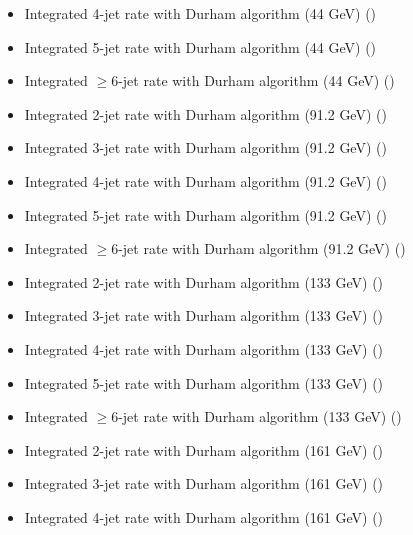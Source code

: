 \begin{itemize}
  \item Integrated 4-jet rate with Durham algorithm (44 GeV) ({\smaller {}})
  \item Integrated 5-jet rate with Durham algorithm (44 GeV) ({\smaller {}})
  \item Integrated $\geq$6-jet rate with Durham algorithm (44 GeV) ({\smaller {}})
  \item Integrated 2-jet rate with Durham algorithm (91.2 GeV) ({\smaller {}})
  \item Integrated 3-jet rate with Durham algorithm (91.2 GeV) ({\smaller {}})
  \item Integrated 4-jet rate with Durham algorithm (91.2 GeV) ({\smaller {}})
  \item Integrated 5-jet rate with Durham algorithm (91.2 GeV) ({\smaller {}})
  \item Integrated $\geq$6-jet rate with Durham algorithm (91.2 GeV) ({\smaller {}})
  \item Integrated 2-jet rate with Durham algorithm (133 GeV) ({\smaller {}})
  \item Integrated 3-jet rate with Durham algorithm (133 GeV) ({\smaller {}})
  \item Integrated 4-jet rate with Durham algorithm (133 GeV) ({\smaller {}})
  \item Integrated 5-jet rate with Durham algorithm (133 GeV) ({\smaller {}})
  \item Integrated $\geq$6-jet rate with Durham algorithm (133 GeV) ({\smaller {}})
  \item Integrated 2-jet rate with Durham algorithm (161 GeV) ({\smaller {}})
  \item Integrated 3-jet rate with Durham algorithm (161 GeV) ({\smaller {}})
  \item Integrated 4-jet rate with Durham algorithm (161 GeV) ({\smaller {}})

\end{itemize}
